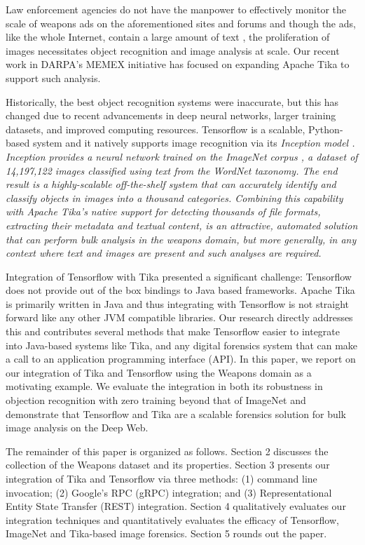 Law enforcement agencies do not have the manpower to effectively monitor the scale of weapons ads on the aforementioned sites and forums and though the ads, like the whole Internet, contain a large amount of text \cite{mphillips-EOT2012}, the proliferation of images necessitates object recognition and image analysis at scale. Our recent work in DARPA's MEMEX initiative has focused on expanding Apache Tika to support such analysis.

Historically, the best object recognition systems were inaccurate, but this has changed due to recent advancements in deep neural networks, larger training datasets, and improved computing resources. Tensorflow is a scalable, Python-based system and it natively supports image recognition via its \em {Inception} model \cite{abadi2016tensorflow}. \em{Inception} provides a neural network trained on the ImageNet corpus \cite{krizhevsky2012imagenet}, a dataset of 14,197,122 images classified using text from the WordNet taxonomy. The end result is a highly-scalable off-the-shelf system that can accurately identify and classify objects in images into a thousand categories. Combining this capability with Apache Tika's native support for detecting thousands of file formats, extracting their metadata and textual content, is an attractive, automated solution that can perform bulk analysis in the weapons domain, but more generally, in any context where text and images are present and such analyses are required.

Integration of Tensorflow with Tika presented a significant challenge: Tensorflow does not provide out of the box bindings to Java based frameworks. Apache Tika is primarily written in Java and thus integrating with Tensorflow is not straight forward like any other JVM compatible libraries. Our research directly addresses this and contributes several methods that make Tensorflow easier to integrate into Java-based systems like Tika, and any digital forensics system that can make a call to an application programming interface (API). In this paper, we report on our integration of Tika and Tensorflow using the Weapons domain as a motivating example. We evaluate the integration in both its robustness in objection recognition with zero training beyond that of ImageNet and demonstrate that Tensorflow and Tika are a scalable forensics solution for bulk image analysis on the Deep Web.

The remainder of this paper is organized as follows. Section 2 discusses the collection of the Weapons dataset and its properties. Section 3 presents our integration of Tika and Tensorflow via three methods: (1) command line invocation; (2) Google's RPC (gRPC) integration; and (3) Representational Entity State Transfer (REST) \cite{Fielding:2000:ASD:932295} integration. Section 4 qualitatively evaluates our integration techniques and quantitatively evaluates the efficacy of Tensorflow, ImageNet and Tika-based image forensics. Section 5 rounds out the paper.